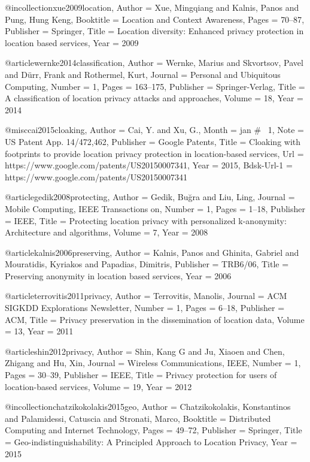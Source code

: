 {{@incollection{xue2009location,
	Author = {Xue, Mingqiang and Kalnis, Panos and Pung, Hung Keng},
	Booktitle = {Location and Context Awareness},
	Pages = {70--87},
	Publisher = {Springer},
	Title = {Location diversity: Enhanced privacy protection in location based services},
	Year = {2009}}

@article{wernke2014classification,
	Author = {Wernke, Marius and Skvortsov, Pavel and D{\"u}rr, Frank and Rothermel, Kurt},
	Journal = {Personal and Ubiquitous Computing},
	Number = {1},
	Pages = {163--175},
	Publisher = {Springer-Verlag},
	Title = {A classification of location privacy attacks and approaches},
	Volume = {18},
	Year = {2014}}

@misc{cai2015cloaking,
	Author = {Cai, Y. and Xu, G.},
	Month = jan # {~1},
	Note = {US Patent App. 14/472,462},
	Publisher = {Google Patents},
	Title = {Cloaking with footprints to provide location privacy protection in location-based services},
	Url = {https://www.google.com/patents/US20150007341},
	Year = {2015},
	Bdsk-Url-1 = {https://www.google.com/patents/US20150007341}}

@article{gedik2008protecting,
	Author = {Gedik, Bu{\u{g}}ra and Liu, Ling},
	Journal = {Mobile Computing, IEEE Transactions on},
	Number = {1},
	Pages = {1--18},
	Publisher = {IEEE},
	Title = {Protecting location privacy with personalized k-anonymity: Architecture and algorithms},
	Volume = {7},
	Year = {2008}}

@article{kalnis2006preserving,
	Author = {Kalnis, Panos and Ghinita, Gabriel and Mouratidis, Kyriakos and Papadias, Dimitris},
	Publisher = {TRB6/06},
	Title = {Preserving anonymity in location based services},
	Year = {2006}}



@article{terrovitis2011privacy,
	Author = {Terrovitis, Manolis},
	Journal = {ACM SIGKDD Explorations Newsletter},
	Number = {1},
	Pages = {6--18},
	Publisher = {ACM},
	Title = {Privacy preservation in the dissemination of location data},
	Volume = {13},
	Year = {2011}}

@article{shin2012privacy,
	Author = {Shin, Kang G and Ju, Xiaoen and Chen, Zhigang and Hu, Xin},
	Journal = {Wireless Communications, IEEE},
	Number = {1},
	Pages = {30--39},
	Publisher = {IEEE},
	Title = {Privacy protection for users of location-based services},
	Volume = {19},
	Year = {2012}}



@incollection{chatzikokolakis2015geo,
	Author = {Chatzikokolakis, Konstantinos and Palamidessi, Catuscia and Stronati, Marco},
	Booktitle = {Distributed Computing and Internet Technology},
	Pages = {49--72},
	Publisher = {Springer},
	Title = {Geo-indistinguishability: A Principled Approach to Location Privacy},
	Year = {2015}}

}}
